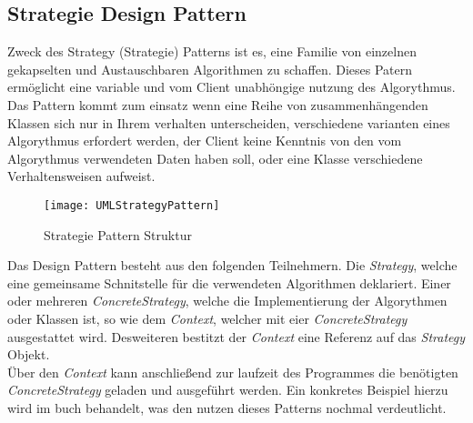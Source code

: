 \subsection{Strategie Design Pattern}
Zweck des Strategy (Strategie) Patterns ist es, eine Familie von einzelnen gekapselten und Austauschbaren Algorithmen zu schaffen. Dieses Patern ermöglicht eine variable und vom Client unabhöngige nutzung des Algorythmus.\\
Das Pattern kommt zum einsatz wenn eine Reihe von zusammenhängenden Klassen sich nur in Ihrem verhalten unterscheiden, verschiedene varianten eines Algorythmus erfordert werden, der Client keine Kenntnis von den vom Algorythmus verwendeten Daten haben soll, oder eine Klasse verschiedene Verhaltensweisen aufweist.\\
\begin{center}
    \begin{figure}[h]
     \centering
     \texttt{[image: UMLStrategyPattern]}
     \caption{Strategie Pattern Struktur \cite{DesignPatterns}}
    \label{fig:StrategyPattern}
    \end{figure}
\end{center}
\vspace{-2cm}
Das Design Pattern besteht aus den folgenden Teilnehmern. Die \textit{Strategy}, welche eine gemeinsame Schnitstelle für die verwendeten Algorithmen deklariert. Einer oder mehreren \textit{ConcreteStrategy}, welche die Implementierung der Algorythmen oder Klassen ist, so wie dem \textit{Context}, welcher mit eier \textit{ConcreteStrategy} ausgestattet wird. Desweiteren bestitzt der \textit{Context} eine Referenz auf das \textit{Strategy} Objekt.\cite[S.383 ff]{DesignPatterns}\\
Über den \textit{Context} kann anschließend zur laufzeit des Programmes die benötigten \textit{ConcreteStrategy} geladen und ausgeführt werden. 
Ein konkretes Beispiel hierzu wird im buch \cite[Head First Design Patterns]{HeadfirstDesignPatterns} behandelt, was den nutzen dieses Patterns nochmal verdeutlicht. 

